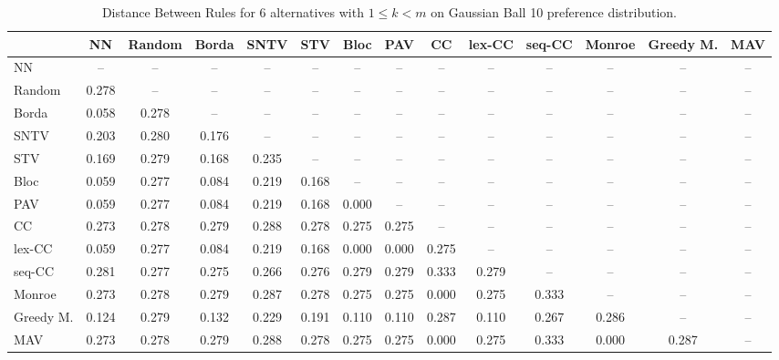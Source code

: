 
\begin{table*}
\centering
\begin{tabular}{lccccccccccccc}
\toprule
 & NN & Random & Borda & SNTV & STV & Bloc & PAV & CC & lex-CC & seq-CC & Monroe & Greedy M. & MAV \\
\midrule
NN & -- & -- & -- & -- & -- & -- & -- & -- & -- & -- & -- & -- & -- \\
Random & 0.278 & -- & -- & -- & -- & -- & -- & -- & -- & -- & -- & -- & -- \\
Borda & 0.058 & 0.278 & -- & -- & -- & -- & -- & -- & -- & -- & -- & -- & -- \\
SNTV & 0.203 & 0.280 & 0.176 & -- & -- & -- & -- & -- & -- & -- & -- & -- & -- \\
STV & 0.169 & 0.279 & 0.168 & 0.235 & -- & -- & -- & -- & -- & -- & -- & -- & -- \\
Bloc & 0.059 & 0.277 & 0.084 & 0.219 & 0.168 & -- & -- & -- & -- & -- & -- & -- & -- \\
PAV & 0.059 & 0.277 & 0.084 & 0.219 & 0.168 & 0.000 & -- & -- & -- & -- & -- & -- & -- \\
CC & 0.273 & 0.278 & 0.279 & 0.288 & 0.278 & 0.275 & 0.275 & -- & -- & -- & -- & -- & -- \\
lex-CC & 0.059 & 0.277 & 0.084 & 0.219 & 0.168 & 0.000 & 0.000 & 0.275 & -- & -- & -- & -- & -- \\
seq-CC & 0.281 & 0.277 & 0.275 & 0.266 & 0.276 & 0.279 & 0.279 & 0.333 & 0.279 & -- & -- & -- & -- \\
Monroe & 0.273 & 0.278 & 0.279 & 0.287 & 0.278 & 0.275 & 0.275 & 0.000 & 0.275 & 0.333 & -- & -- & -- \\
Greedy M. & 0.124 & 0.279 & 0.132 & 0.229 & 0.191 & 0.110 & 0.110 & 0.287 & 0.110 & 0.267 & 0.286 & -- & -- \\
MAV & 0.273 & 0.278 & 0.279 & 0.288 & 0.278 & 0.275 & 0.275 & 0.000 & 0.275 & 0.333 & 0.000 & 0.287 & -- \\
\bottomrule
\end{tabular}

\caption{Distance Between Rules for 6 alternatives with $1 \leq k < m$ on Gaussian Ball 10 preference distribution.}
\end{table*}
